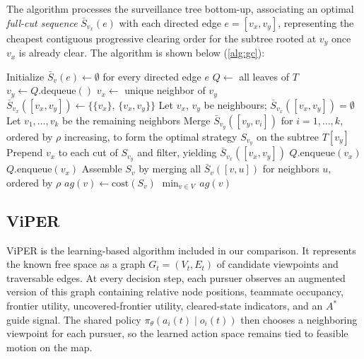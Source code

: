\documentclass[conference]{IEEEtran}
\begin{document}
The algorithm processes the surveillance tree bottom-up, associating an optimal \textit{full-cut sequence} $\bar{S}_{v_x}(e)$ with each directed edge $e = [v_x, v_y]$, representing the cheapest contiguous progressive clearing order for the subtree rooted at $v_y$ once $v_x$ is already clear.
The algorithm is shown below (\ref{alg:gc}):
\begin{algorithm}
\caption{Graph-Clear: Optimal Contiguous Strategy on a Tree}
\label{alg:gc}
\begin{algorithmic}[1]
    \State Initialize $\bar{S}_{v}(e) \gets \emptyset$ for every directed edge $e$
    \State $Q \gets $ all leaves of $T$
        \State $v_y \gets Q.\mathrm{dequeue}()$
            \State $v_x \gets $ unique neighbor of $v_y$
            \State $\bar{S}_{v_x}([v_x, v_y]) \gets \bigl\{\{v_x\},\,\{v_x, v_y\}\bigr\}$
        \Else
            \State Let $v_x$, $v_y$ be neighbours; $\bar{S}_{v_x}([v_x,v_y]) = \emptyset$
            \State Let $v_1,\dots,v_k$ be the remaining neighbors
            \State Merge $\bar{S}_{v_y}([v_y, v_i])$ for $i=1,\dots,k$, ordered by $\rho$ increasing, to form the optimal strategy $S_{v_y}$ on the subtree $T[v_y]$
            \State Prepend $v_x$ to each cut of $S_{v_y}$ and filter,
            \Statex \hspace{3.5em} yielding $\bar{S}_{v_x}([v_x, v_y])$
                \State $Q.\mathrm{enqueue}(v_x)$
                \State $Q.\mathrm{enqueue}(v_x)$
            \EndIf
        \EndIf
    \EndWhile
        \State Assemble $S_v$ by merging all $\bar{S}_{v}([v, u])$ for neighbors $u$, ordered by $\rho$
        \State $\mathit{ag}(v) \gets \mathrm{cost}(S_v)$
    \EndFor
    \State \Return $\min_{v \in V}\,\mathit{ag}(v)$
\EndProcedure
\end{algorithmic}
\end{algorithm}
\subsection{ViPER}

ViPER is the learning-based algorithm included in our comparison.
It represents the known free space as a graph $G_t=(V_t,E_t)$ of candidate viewpoints and traversable edges.
At every decision step, each pursuer observes an augmented version of this graph containing relative node positions, teammate occupancy, frontier utility, uncovered-frontier utility, cleared-state indicators, and an $A^*$ guide signal.
The shared policy $\pi_\theta(a_i(t)\mid o_i(t))$ then chooses a neighboring viewpoint for each pursuer, so the learned action space remains tied to feasible motion on the map.
\end{document}
